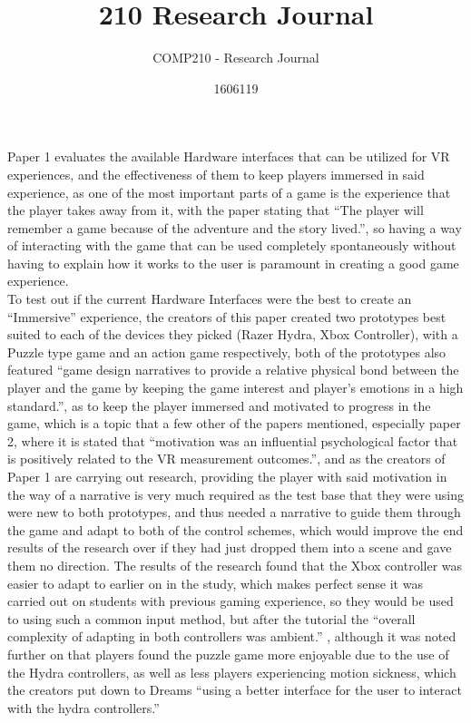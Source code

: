 \documentclass{scrartcl}
\title{210 Research Journal}
\subtitle{COMP210 - Research Journal}
\author{1606119}
\begin{document}
\maketitle
Paper 1 \cite{mentzelopoulos2015hardware} evaluates the available Hardware interfaces that can be utilized for VR experiences, and the effectiveness of them to keep players immersed in said experience, as one of the most important parts of a game is the experience that the player takes away from it, with the paper stating that ``The player will remember a game because of the adventure and the story lived.''\cite{mentzelopoulos2015hardware}, so having a way of interacting with the game that can be used completely spontaneously without having to explain how it works to the user is paramount in creating a good game experience.\\

To test out if the current Hardware Interfaces were the best to create an ``Immersive'' experience, the creators of this paper created two prototypes best suited to each of the devices they picked (Razer Hydra, Xbox Controller), with a Puzzle type game and an action game respectively, both of the prototypes also featured ``game design narratives to provide a relative physical bond between the player and the game by keeping the game interest and player's emotions in a high standard.''\cite{mentzelopoulos2015hardware}, as to keep the player immersed and motivated to progress in the game, which is a topic that a few other of the papers mentioned, especially paper 2\cite{hvannberg2012exploitation}, where it is stated that ``motivation was an influential psychological factor that is positively related to the VR measurement outcomes.''\cite{hvannberg2012exploitation}, and as the creators of Paper 1 are carrying out research, providing the player with said motivation in the way of a narrative is very much required as the test base that they were using were new to both prototypes, and thus needed a narrative to guide them through the game and adapt to both of the control schemes, which would improve the end results of the research over if they had just dropped them into a scene and gave them no direction. The results of the research found that the Xbox controller was easier to adapt to earlier on in the study, which makes perfect sense it was carried out on students with previous gaming experience, so they would be used to using such a common input method, but after the tutorial the ``overall complexity of adapting in both controllers was ambient.'' \cite{mentzelopoulos2015hardware}, although it was noted further on that players found the puzzle game more enjoyable due to the use of the Hydra controllers, as well as less players experiencing motion sickness, which the creators put down to Dreams ``using a better interface for the user to interact with the hydra controllers.''\cite{mentzelopoulos2015hardware}\\
\end{document}
